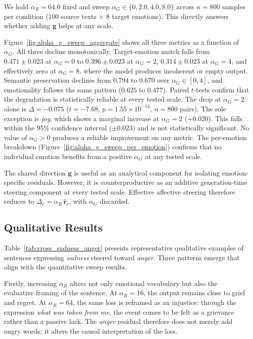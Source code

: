 We hold $\alpha_R = 64.0$ fixed and sweep $\alpha_G \in \{0, 2.0, 4.0, 8.0\}$ across $n = 800$ samples per condition ($100$ source texts $\times$ $8$ target emotions). This directly answers whether adding $\mathbf{g}$ helps at any scale.

Figure~\ref{fig:alpha_g_sweep_aggregate} shows all three metrics as a function of $\alpha_G$. All three decline monotonically. Target-emotion match falls from $0.471 \pm 0.023$ at $\alpha_G = 0$ to $0.396 \pm 0.023$ at $\alpha_G = 2$, $0.314 \pm 0.023$ at $\alpha_G = 4$, and effectively zero at $\alpha_G = 8$, where the model produces incoherent or empty output. Semantic preservation declines from $0.794$ to $0.670$ over $\alpha_G \in [0, 4]$, and emotionality follows the same pattern ($0.625$ to $0.477$). Paired $t$-tests confirm that the degradation is statistically reliable at every tested scale. The drop at $\alpha_G = 2$ alone is $\Delta = -0.075$ ($t = -7.68$, $p = 1.55 \times 10^{-14}$, $n = 800$ pairs). The sole exception is \textit{joy}, which shows a marginal increase at $\alpha_G = 2$ ($+0.020$). This falls within the 95\% confidence interval ($\pm 0.023$) and is not statistically significant. No value of $\alpha_G > 0$ produces a reliable improvement on any metric. The per-emotion breakdown (Figure~\ref{fig:alpha_g_sweep_per_emotion}) confirms that no individual emotion benefits from a positive $\alpha_G$ at any tested scale.

The shared direction $\mathbf{g}$ is useful as an analytical component for isolating emotion-specific residuals. However, it is counterproductive as an additive generation-time steering component at every tested scale. Effective affective steering therefore reduces to $\Delta_e = \alpha_R\,\hat{\mathbf{r}}_e$, with $\alpha_G$ discarded.

\subsection{Qualitative Results} 
\label{sec:steering_causal_validation} 

Table~\ref{tab:cross_sadness_anger} presents representative qualitative examples of sentences expressing \textit{sadness} steered toward \textit{anger}. Three patterns emerge that align with the quantitative sweep results.\par

Firstly, increasing $\alpha_R$ alters not only emotional vocabulary but also the evaluative framing of the sentence. At $\alpha_R=16$, the output remains close to grief and regret. At $\alpha_R=64$, the same loss is reframed as an injustice: through the expression \textit{what was taken from me}, the event comes to be felt as a grievance rather than a passive lack. The \textit{anger} residual therefore does not merely add angry words; it alters the causal interpretation of the loss.\par

